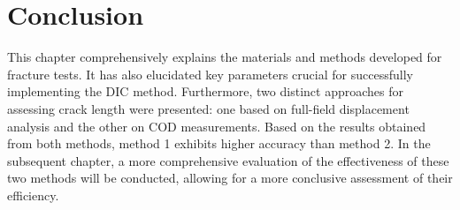 \section{Conclusion}

This chapter comprehensively explains the materials and methods developed for fracture tests. It has also elucidated key parameters crucial for successfully implementing the DIC method. Furthermore, two distinct approaches for assessing crack length were presented: one based on full-field displacement analysis and the other on COD measurements.
Based on the results obtained from both methods, method 1 exhibits higher accuracy than method 2. In the subsequent chapter, a more comprehensive evaluation of the effectiveness of these two methods will be conducted, allowing for a more conclusive assessment of their efficiency.

